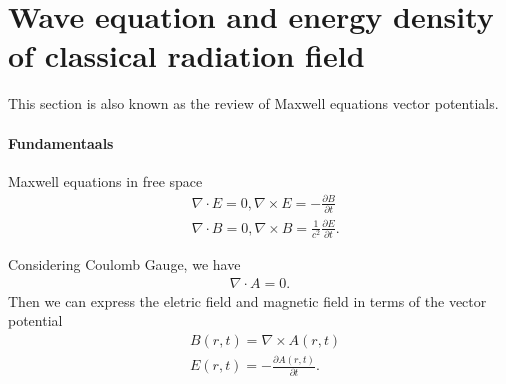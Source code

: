 \documentclass[../../note.tex]{subfiles}
\begin{document}
\section{Wave equation and energy density of classical radiation field}
This section  is also known as the review of Maxwell equations vector potentials.

\paragraph{Fundamentaals}
Maxwell equations in free space
\begin{align}
    \label{eq: Maxwell equations in free space}
    &\nabla \cdot E = 0, \nabla \times E = - \frac{\partial B}{\partial t} \\
    &\nabla \cdot B = 0, \nabla \times B = \frac{1}{c^2} \frac{\partial E}{\partial t}.
\end{align}

\begin{lemma}
    \label{lemma: Coulomb Gauge}
    Considering Coulomb Gauge, we have
    \begin{align}
        \nabla \cdot A = 0.
    \end{align}
    Then we can express the eletric field and magnetic field in terms of the vector potential 
    \begin{align}
        & B(r,t) = \nabla \times A(r,t) \\
        & E(r,t) = -\frac{\partial A(r,t)}{\partial t}.
    \end{align}
\end{lemma}
\end{document}
